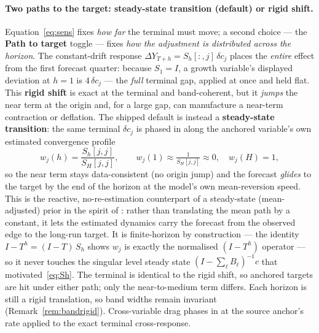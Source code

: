\documentclass[11pt]{article}
\newcommand{\ui}[1]{\textbf{#1}}
\theoremstyle{plain}
\theoremstyle{remark}
\begin{document}
\paragraph{Two paths to the target: steady-state transition (default) or
rigid shift.} Equation~\eqref{eq:sens} fixes \emph{how far} the terminal
must move; a second choice --- the \ui{Path to target} toggle --- fixes
\emph{how the adjustment is distributed across the horizon}. The
constant-drift response $\Delta Y_{T+h}=S_h[:,j]\,\delta c_j$ places the
\emph{entire} effect from the first forecast quarter: because $S_1=I$, a
growth variable's displayed deviation at $h=1$ is $4\,\delta c_j$ --- the
\emph{full} terminal gap, applied at once and held flat. This
\ui{rigid shift} is exact at the terminal and band-coherent, but it
\emph{jumps} the near term at the origin and, for a large gap, can
manufacture a near-term contraction or deflation. The shipped default is
instead a \ui{steady-state transition}: the same terminal $\delta c_j$ is
phased in along the anchored variable's own estimated convergence profile
\begin{equation}\label{eq:transition}
  w_j(h) = \frac{S_h[j,j]}{S_H[j,j]},
  \qquad w_j(1)\approx \tfrac{1}{S_H[j,j]}\approx 0,\quad w_j(H)=1,
\end{equation}
so the near term stays data-consistent (no origin jump) and the forecast
\emph{glides} to the target by the end of the horizon at the model's own
mean-reversion speed. This is the reactive, no-re-estimation counterpart
of a steady-state (mean-adjusted) prior in the spirit of
\citet{Villani2009}: rather than translating the mean path by a constant,
it lets the estimated dynamics carry the forecast from the observed edge
to the long-run target. It is finite-horizon by construction --- the
identity $I-T^h = (I-T)\,S_h$ shows $w_j$ is exactly the normalised
$(I-T^h)$ operator --- so it never touches the singular level steady
state $(I-\sum_\ell B_\ell)^{-1}c$ that motivated~\eqref{eq:Sh}. The
terminal is identical to the rigid shift, so anchored targets are hit
under either path; only the near-to-medium term differs. Each horizon is
still a rigid translation, so band widths remain invariant
(Remark~\ref{rem:bandrigid}). Cross-variable drag phases in at the source
anchor's rate applied to the exact terminal cross-response.
\end{document}
